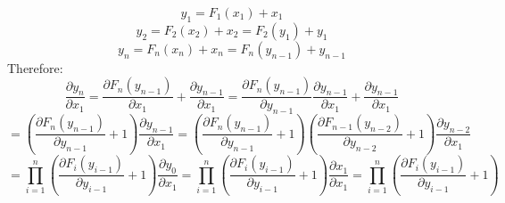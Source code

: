 \documentclass{article}
\begin{document}
    \[
        y_1 = F_1(x_1) + x_1
    \]
    \[
        y_2 = F_2(x_2) + x_2 = F_2(y_1) + y_1
    \]
    \[
        y_n = F_n(x_n) + x_n = F_n(y_{n-1}) + y_{n-1}
    \]
    Therefore:
    \[
        \frac{\partial y_n}{\partial x_1} = 
        \frac{\partial F_n(y_{n-1})}{\partial x_1} + \frac{\partial y_{n-1}}{\partial x_1} =
        \frac{\partial F_n(y_{n-1})}{\partial y_{n-1}}\frac{\partial y_{n-1}}{\partial x_1} + \frac{\partial y_{n-1}}{\partial x_1} 
    \]
    \[
        =\left(\frac{\partial F_n(y_{n-1})}{\partial y_{n-1}} + 1\right) 
        \frac{\partial y_{n-1}}{\partial x_1} 
        =\left(\frac{\partial F_n(y_{n-1})}{\partial y_{n-1}} + 1\right) 
        \left(\frac{\partial F_{n-1}(y_{n-2})}{\partial y_{n-2}} + 1\right)
        \frac{\partial y_{n-2}}{\partial x_1} 
    \]
    \[
        =\prod_{i=1}^{n}\left(
            \frac{\partial F_i(y_{i-1})}{\partial y_{i-1}} + 1
        \right)\frac{\partial y_{0}}{\partial x_1} 
        = \prod_{i=1}^{n}\left(
            \frac{\partial F_i(y_{i-1})}{\partial y_{i-1}} + 1
        \right)\frac{\partial x_1}{\partial x_1} 
        = \prod_{i=1}^{n}\left(
            \frac{\partial F_i(y_{i-1})}{\partial y_{i-1}} + 1
        \right)
    \]
\end{document}
